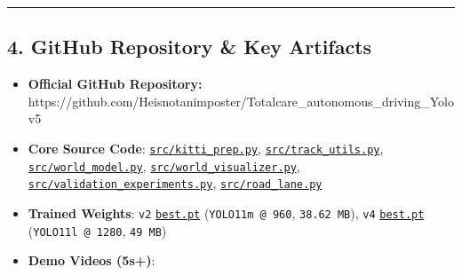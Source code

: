 \documentclass[10.5pt,a4paper]{article}
\begin{document}
\par\noindent\rule{\textwidth}{0.4pt}\par\medskip

\subsection{4. GitHub Repository \& Key Artifacts}

\begin{itemize}[leftmargin=1.5em,itemsep=2pt]
\item \textbf{Official GitHub Repository:} https:\allowbreak{}/\allowbreak{}/\allowbreak{}github.\allowbreak{}com/\allowbreak{}Heisnotanimposter/\allowbreak{}Totalcare\_\allowbreak{}autonomous\_\allowbreak{}driving\_\allowbreak{}Yolov5
\item \textbf{Core Source Code}: \href{https://github.com/Heisnotanimposter/Totalcare\_autonomous\_driving\_Yolov5/blob/main/src/kitti\_prep.py}{\texttt{src/\allowbreak{}kitti\_\allowbreak{}prep.\allowbreak{}py}}, \href{https://github.com/Heisnotanimposter/Totalcare\_autonomous\_driving\_Yolov5/blob/main/src/track\_utils.py}{\texttt{src/\allowbreak{}track\_\allowbreak{}utils.\allowbreak{}py}}, \href{https://github.com/Heisnotanimposter/Totalcare\_autonomous\_driving\_Yolov5/blob/main/src/world\_model.py}{\texttt{src/\allowbreak{}world\_\allowbreak{}model.\allowbreak{}py}}, \href{https://github.com/Heisnotanimposter/Totalcare\_autonomous\_driving\_Yolov5/blob/main/src/world\_visualizer.py}{\texttt{src/\allowbreak{}world\_\allowbreak{}visualizer.\allowbreak{}py}}, \href{https://github.com/Heisnotanimposter/Totalcare\_autonomous\_driving\_Yolov5/blob/main/src/validation\_experiments.py}{\texttt{src/\allowbreak{}validation\_\allowbreak{}experiments.\allowbreak{}py}}, \href{https://github.com/Heisnotanimposter/Totalcare\_autonomous\_driving\_Yolov5/blob/main/src/road\_lane.py}{\texttt{src/\allowbreak{}road\_\allowbreak{}lane.\allowbreak{}py}}
\item \textbf{Trained Weights}: \texttt{v2} \href{https://github.com/Heisnotanimposter/Totalcare\_autonomous\_driving\_Yolov5/blob/main/results/v2\_improved/outputs/weights/best.pt}{\texttt{best.\allowbreak{}pt}} (\texttt{YOLO11m @ 960}, \texttt{38.\allowbreak{}62 MB}), \texttt{v4} \href{https://github.com/Heisnotanimposter/Totalcare\_autonomous\_driving\_Yolov5/blob/main/results/v4\_road\_lane/detect\_outputs/outputs/weights/best.pt}{\texttt{best.\allowbreak{}pt}} (\texttt{YOLO11l @ 1280}, \texttt{49 MB})
\item \textbf{Demo Videos (5s+)}:

\end{itemize}
\end{document}
